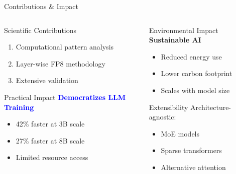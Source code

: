 \begin{frame}{Contributions \& Impact}

\begin{columns}[t]
\begin{column}{0.48\textwidth}
    \begin{block}{Scientific Contributions}
    \small
    \begin{enumerate}
        \item Computational pattern analysis
        \item Layer-wise FP8 methodology
        \item Extensive validation
    \end{enumerate}
    \end{block}

    \vspace{0.2cm}

    \begin{block}{Practical Impact}
    \small
    \textcolor{blue}{\textbf{Democratizes LLM Training}}
    \begin{itemize}
        \item 42\% faster at 3B scale
        \item 27\% faster at 8B scale
        \item Limited resource access
    \end{itemize}
    \end{block}
\end{column}

\begin{column}{0.48\textwidth}
    \begin{block}{Environmental Impact}
    \small
    \textcolor{green!60!black}{\textbf{Sustainable AI}}
    \begin{itemize}
        \item Reduced energy use
        \item Lower carbon footprint
        \item Scales with model size
    \end{itemize}
    \end{block}

    \vspace{0.2cm}

    \begin{block}{Extensibility}
    \small
    Architecture-agnostic:
    \begin{itemize}
        \item MoE models
        \item Sparse transformers
        \item Alternative attention
    \end{itemize}
    \end{block}
\end{column}
\end{columns}

\end{frame}
